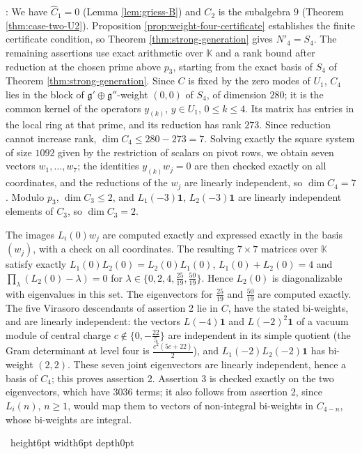 \documentclass[leqno]{article}
\newcommand{\K}{\ensuremath{\mathbb{K}}}
\renewcommand{\leq}{\ensuremath{\leqslant}}
\renewcommand{\geq}{\ensuremath{\geqslant}}
\newcommand{\qed}{\hfill \vrule height6pt  width6pt depth0pt}
\newenvironment{proof}[1][]{\noindent {\it Proof #1} : }{\hbox{~}\qed
\smallskip
}
\numberwithin{equation}{section}
\begin{document}
\begin{proof}
We have $\widehat C_1 = 0$ (Lemma \ref{lem:griess-B}) and $C_2$ is the subalgebra $9$ (Theorem \ref{thm:case-two-U2}). Proposition \ref{prop:weight-four-certificate} establishes the finite certificate condition, so Theorem \ref{thm:strong-generation} gives $N'_4 = S_4$. The remaining assertions use exact arithmetic over $\K$ and a rank bound after reduction at the chosen prime above $p_3$, starting from the exact basis of $S_4$ of Theorem \ref{thm:strong-generation}. Since $C$ is fixed by the zero modes of $U_1$, $C_4$ lies in the block of $\mathfrak g' \oplus \mathfrak g''$-weight $(0,0)$ of $S_4$, of dimension $280$; it is the common kernel of the operators $y_{(k)}$, $y \in U_1$, $0 \leq k \leq 4$. Its matrix has entries in the local ring at that prime, and its reduction has rank $273$. Since reduction cannot increase rank, $\dim C_4 \leq 280-273 = 7$. Solving exactly the square system of size $1092$ given by the restriction of scalars on pivot rows, we obtain seven vectors $w_1, \ldots, w_7$; the identities $y_{(k)}w_j = 0$ are then checked exactly on all coordinates, and the reductions of the $w_j$ are linearly independent, so $\dim C_4 = 7$. Modulo $p_3$, $\dim C_3 \leq 2$, and $L_1(-3)\mathbf 1$, $L_2(-3)\mathbf 1$ are linearly independent elements of $C_3$, so $\dim C_3 = 2$.

The images $L_i(0)w_j$ are computed exactly and expressed exactly in the basis $(w_j)$, with a check on all coordinates. The resulting $7 \times 7$ matrices over $\K$ satisfy exactly $L_1(0)L_2(0) = L_2(0)L_1(0)$, $L_1(0)+L_2(0) = 4$ and $\prod_\lambda (L_2(0)-\lambda) = 0$ for $\lambda \in \{0,2,4,\frac{25}{19},\frac{50}{19}\}$. Hence $L_2(0)$ is diagonalizable with eigenvalues in this set. The eigenvectors for $\frac{25}{19}$ and $\frac{50}{19}$ are computed exactly. The five Virasoro descendants of assertion 2 lie in $C$, have the stated bi-weights, and are linearly independent: the vectors $L(-4)\mathbf 1$ and $L(-2)^2\mathbf 1$ of a vacuum module of central charge $c \notin \{0,-\frac{22}{5}\}$ are independent in its simple quotient (the Gram determinant at level four is $\frac{c^2(5c+22)}{2}$), and $L_1(-2)L_2(-2)\mathbf 1$ has bi-weight $(2,2)$. These seven joint eigenvectors are linearly independent, hence a basis of $C_4$; this proves assertion 2. Assertion 3 is checked exactly on the two eigenvectors, which have $3036$ terms; it also follows from assertion 2, since $L_i(n)$, $n \geq 1$, would map them to vectors of non-integral bi-weights in $C_{4-n}$, whose bi-weights are integral.


\end{proof}
\end{document}
